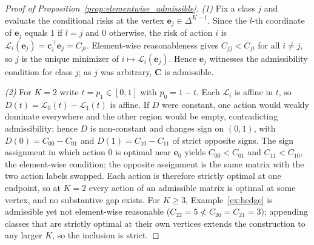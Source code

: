 \begin{proof}[Proof of Proposition~\ref{prop:elementwise_admissible}]
    \emph{(1)} Fix a class $j$ and evaluate the conditional risks at the vertex $\mathbf{e}_j \in \Delta^{K-1}$. Since the $l$-th coordinate of $\mathbf{e}_j$ equals $1$ if $l = j$ and $0$ otherwise, the risk of action $i$ is $\mathcal{L}_i(\mathbf{e}_j) = \mathbf{c}_i^\top \mathbf{e}_j = C_{ji}$. Element-wise reasonableness gives $C_{jj} < C_{ji}$ for all $i \neq j$, so $j$ is the unique minimizer of $i \mapsto \mathcal{L}_i(\mathbf{e}_j)$. Hence $\mathbf{e}_j$ witnesses the admissibility condition for class $j$; as $j$ was arbitrary, $\mathbf{C}$ is admissible.

    \emph{(2)} For $K = 2$ write $t = p_1 \in [0, 1]$ with $p_0 = 1 - t$. Each $\mathcal{L}_i$ is affine in $t$, so $D(t) = \mathcal{L}_0(t) - \mathcal{L}_1(t)$ is affine. If $D$ were constant, one action would weakly dominate everywhere and the other region would be empty, contradicting admissibility; hence $D$ is non-constant and changes sign on $(0,1)$, with $D(0) = C_{00} - C_{01}$ and $D(1) = C_{10} - C_{11}$ of strict opposite signs. The sign assignment in which action $0$ is optimal near $\mathbf{e}_0$ yields $C_{00} < C_{01}$ and $C_{11} < C_{10}$, the element-wise condition; the opposite assignment is the same matrix with the two action labels swapped. Each action is therefore strictly optimal at one endpoint, so at $K = 2$ every action of an admissible matrix is optimal at some vertex, and no substantive gap exists. For $K \ge 3$, Example~\ref{ex:hedge} is admissible yet not element-wise reasonable ($C_{22} = 5 \not< C_{20} = C_{21} = 3$); appending classes that are strictly optimal at their own vertices extends the construction to any larger $K$, so the inclusion is strict.
\end{proof}

